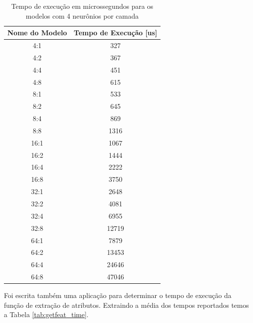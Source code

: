 \documentclass[a5paper]{ufsc-thesis}  %
\begin{document}
\begin{table}[h]
    \centering
    \begin{tabular}{|c|c|}
         \hline Nome do Modelo  & Tempo de Execução [us] \\
         \hline 4:1             & 327                    \\
         \hline 4:2             & 367                    \\
         \hline 4:4             & 451                    \\
         \hline 4:8             & 615                    \\
         \hline 8:1             & 533                    \\
         \hline 8:2             & 645                    \\
         \hline 8:4             & 869                    \\
         \hline 8:8             & 1316                   \\
         \hline 16:1            & 1067                   \\
         \hline 16:2            & 1444                   \\
         \hline 16:4            & 2222                   \\
         \hline 16:8            & 3750                   \\
         \hline 32:1            & 2648                   \\
         \hline 32:2            & 4081                   \\
         \hline 32:4            & 6955                   \\
         \hline 32:8            & 12719                  \\
         \hline 64:1            & 7879                   \\
         \hline 64:2            & 13453                  \\
         \hline 64:4            & 24646                  \\
         \hline 64:8            & 47046                  \\   
         \hline
    \end{tabular}
    \caption{Tempo de execução em microssegundos para os modelos com 4 neurônios por camada}
    \label{tab:execution_times}
\end{table}


Foi escrita também uma aplicação para determinar o tempo de execução da função de extração de atributos. Extraindo a média dos tempos reportados temos a Tabela \ref{tab:getfeat_time}.
\end{document}
